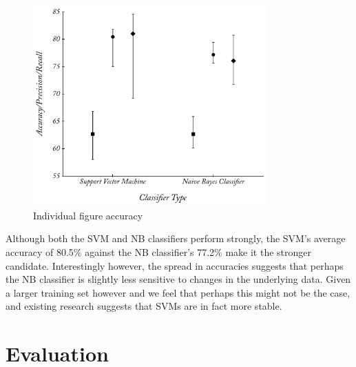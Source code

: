 \begin{figure}
	\caption{Individual figure accuracy}
	\label{fig:subj_class}
	\centering
		\includegraphics[width=0.8\textwidth]{graphs/subj_class.pdf}
\end{figure}

Although both the SVM and NB classifiers perform strongly, the SVM's average accuracy of 80.5\% against the NB classifier's 77.2\% make it the stronger candidate. Interestingly however, the spread in accuracies suggests that perhaps the NB classifier is slightly less sensitive to changes in the underlying data. Given a larger training set however and we feel that perhaps this might not be the case, and existing research \cite{Pang:2008wj} suggests that SVMs are in fact more stable.

\section{Evaluation}




